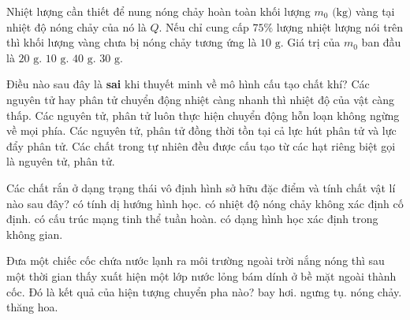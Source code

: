 \begin{ex}	Nhiệt lượng cần thiết để nung nóng chảy hoàn toàn khối lượng $m_0\text{ (kg)}$ vàng tại nhiệt độ nóng chảy của nó là $Q$. Nếu chỉ cung cấp $75\%$ lượng nhiệt lượng nói trên thì khối lượng vàng chưa bị nóng chảy tương ứng là $10\text{ g}$. Giá trị của $m_0$ ban đầu là
	\choice
	{$20\text{ g}$.}
	{$10\text{ g}$.}
	{\True $40\text{ g}$.}
	{$30\text{ g}$.}
\end{ex}

\begin{ex}	Điều nào sau đây là \textbf{sai} khi thuyết minh về mô hình cấu tạo chất khí?
	\choice
	{\True Các nguyên tử hay phân tử chuyển động nhiệt càng nhanh thì nhiệt độ của vật càng thấp.}
	{Các nguyên tử, phân tử luôn thực hiện chuyển động hỗn loạn không ngừng về mọi phía.}
	{Các nguyên tử, phân tử đồng thời tồn tại cả lực hút phân tử và lực đẩy phân tử.}
	{Các chất trong tự nhiên đều được cấu tạo từ các hạt riêng biệt gọi là nguyên tử, phân tử.}
\end{ex}

\begin{ex}	Các chất rắn ở dạng trạng thái vô định hình sở hữu đặc điểm và tính chất vật lí nào sau đây?
	\choice
	{có tính dị hướng hình học.}
	{\True có nhiệt độ nóng chảy không xác định cố định.}
	{có cấu trúc mạng tinh thể tuần hoàn.}
	{có dạng hình học xác định trong không gian.}
\end{ex}

\begin{ex}	Đưa một chiếc cốc chứa nước lạnh ra môi trường ngoài trời nắng nóng thì sau một thời gian thấy xuất hiện một lớp nước lỏng bám dính ở bề mặt ngoài thành cốc. Đó là kết quả của hiện tượng chuyển pha nào?
	\choice
	{bay hơi.}
	{\True ngưng tụ.}
	{nóng chảy.}
	{thăng hoa.}
\end{ex}

